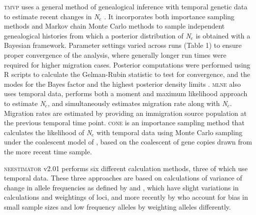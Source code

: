 \textsc{tmvp} uses a general method of genealogical inference with temporal genetic data to 
estimate recent changes in \emph{N}$_e$ \citep{Beaumont:2003}. It incorporates both importance 
sampling methods and Markov chain Monte Carlo methods to sample independent genealogical 
histories from which a posterior distribution of \emph{N}$_e$ is obtained with a Bayesian 
framework. Parameter settings varied across runs (Table 1) to ensure proper convergence of 
the analysis, where generally longer run times were required for higher migration cases. 
Posterior computations were performed using R scripts to calculate the Gelman-Rubin statistic 
to test for convergence, and the modes for the Bayes factor and the highest posterior density 
limits \citep{Barker:2011}. \textsc{mlne} \citep{Wang:2003} also uses temporal data, performs 
both a moment and maximum likelihood approach to estimate \emph{N}$_e$, and simultaneously 
estimates migration rate along with \emph{N}$_e$. Migration rates are estimated by providing 
an immigration source population at the previous temporal time point. \textsc{cone} \citep{Anderson:2005} 
is an importance sampling method that calculates the likelihood of \emph{N}$_e$ with temporal 
data using Monte Carlo sampling under the coalescent model of \citet{Berthier:2002}, based on 
the coalescent of gene copies drawn from the more recent time sample.

\textsc{neestimator} v2.01 \citep{Do:2014} performs six different calculation methods, three 
of which use temporal data. These three approaches are based on calculations of variance of 
change in allele frequencies as defined by \citet{Nei:1981} and \citet{Pollak:1983}, which 
have slight variations in calculations and weightings of loci, and more recently by \citet{Jorde:2007} 
who account for bias in small sample sizes and low frequency alleles by 
weighting alleles differently.

